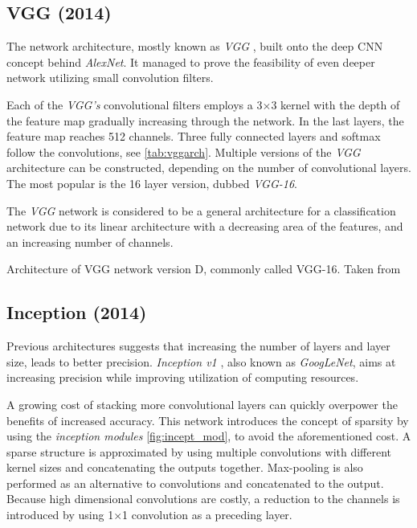 \subsection{VGG (2014)}
\label{sec:VGG}
The network architecture, mostly known as \textit{VGG} \cite{bib:vgg}, built onto the deep CNN concept behind \textit{AlexNet}. It managed to prove the feasibility of even deeper network utilizing small convolution filters. 

Each of the \textit{VGG's} convolutional filters employs a 3$\times$3 kernel with the depth of the feature map gradually increasing through the network. In the last layers, the feature map reaches 512 channels. Three fully connected layers and softmax follow the convolutions, see \cref{tab:vggarch}. Multiple versions of the \textit{VGG} architecture can be constructed, depending on the number of convolutional layers. The most popular is the 16 layer version, dubbed \textit{VGG-16}.

The \textit{VGG} network is considered to be a general architecture for a classification network due to its linear architecture with a decreasing area of the features, and an increasing number of channels. 

\begin{table}
    \centering
    \caption{Architecture of VGG network version D, commonly called VGG-16. Taken from \cite[table 1]{bib:vgg}}
    \label{tab:vggarch}
\end{table}
    
\subsection{Inception (2014)}
\label{sec:inception}
Previous architectures suggests that increasing the number of layers and layer size, leads to better precision. \textit{Inception v1} \cite{bib:googlenet}, also known as \textit{GoogLeNet}, aims at increasing precision while improving utilization of computing resources.

A growing cost of stacking more convolutional layers can quickly overpower the benefits of increased accuracy. This network introduces the concept of sparsity by using the \textit{inception modules} \cref{fig:incept_mod}, to avoid the aforementioned cost. A sparse structure is approximated by using multiple convolutions with different kernel sizes and concatenating the outputs together. Max-pooling is also performed as an alternative to convolutions and concatenated to the output. Because high dimensional convolutions are costly, a reduction to the channels is introduced by using 1$\times$1 convolution as a preceding layer.

